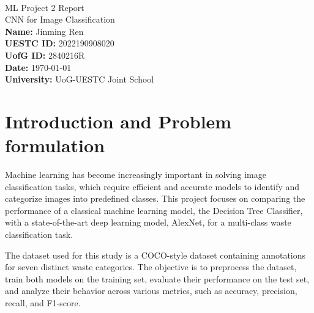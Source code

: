 \documentclass[a4paper,12pt]{article}
\begin{document}
\begin{center}
    \textbf{ } \\
    \vspace{4em}
    {\huge \textsf{ML Project 2 Report}} \\
    \vspace{1.5em}
    {\large \textsf{CNN for Image Classification}} \\
    \vspace{1em}
    \vspace{1.5cm}
    \textbf{Name:} Jinming Ren \\
    \vspace{0.5em}
    \textbf{UESTC ID:} 2022190908020 \\
    \vspace{0.5em}
    \textbf{UofG ID:} 2840216R \\
    \vspace{0.5em}
    \textbf{Date:} \today \\
    \vspace{0.5em}
    \vspace{0.5cm}
    \textbf{University:} UoG-UESTC Joint School \\
    \vspace{1.5em}
\end{center}

\newpage
\tableofcontents
\listoffigures
\listoftables


\newpage

\section{Introduction and Problem formulation}

Machine learning has become increasingly important in solving image classification tasks, which require efficient and accurate models to identify and categorize images into predefined classes. This project focuses on comparing the performance of a classical machine learning model, the Decision Tree Classifier, with a state-of-the-art deep learning model, AlexNet, for a multi-class waste classification task.

The dataset used for this study is a COCO-style dataset containing annotations for seven distinct waste categories. The objective is to preprocess the dataset, train both models on the training set, evaluate their performance on the test set, and analyze their behavior across various metrics, such as accuracy, precision, recall, and F1-score.
\end{document}
